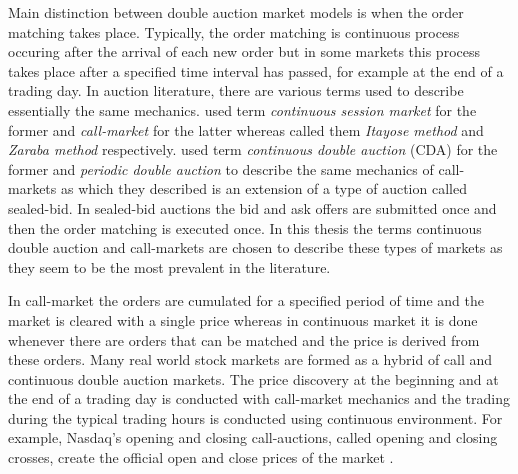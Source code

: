 Main distinction between double auction market models is when
the order matching takes place. Typically, the order matching 
is continuous process occuring after the arrival of each new order but
in some markets this process takes place after a specified time interval
has passed, for example at the end of a trading day. \citep{boer05}
In auction literature, there are various terms used to describe essentially 
the same mechanics. \citet{boer05} used term 
\textit{continuous session market} for the former and \textit{call-market}
for the latter whereas \citet{ASt05} called them \textit{Itayose method}
and \textit{Zaraba method} respectively. \citet{Moc15} used term \textit{continuous 
double auction} (CDA) for the former and \textit{periodic double auction} to describe 
the same mechanics of call-markets as which they described is an extension of 
a type of auction called sealed-bid. In sealed-bid auctions the bid and ask offers
are submitted once and then the order matching is executed once. In this thesis
the terms continuous double auction and call-markets are chosen to describe
these types of markets as they seem to be the most prevalent in the literature.

In call-market the orders are cumulated for a specified period of time and the
market is cleared with a single price whereas in continuous market it is done
whenever there are orders that can be matched and the price is derived from these
orders. \citep{boer05} 
Many real world stock markets are formed as a hybrid of call and continuous
double auction markets. The price discovery at the beginning and at the end of a 
trading day is conducted with call-market mechanics and the trading during the 
typical trading hours is conducted using continuous environment. \citet{NasdaqClosing05}
For example, Nasdaq's opening and closing call-auctions, called opening and closing crosses,
create the official open and close prices of the market \citet{NasdaqCrosses}.  
 
